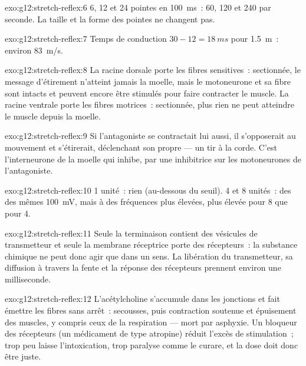 \begin{solution}{exo:g12:stretch-reflex:6}
6, 12 et 24 pointes en \qty{100}{ms}~: 60, 120 et 240 par seconde. La
taille et la forme des pointes ne changent pas.
\end{solution}

\begin{solution}{exo:g12:stretch-reflex:7}
Temps de conduction $30 - 12 = \qty{18}{ms}$ pour \qty{1.5}{m}~:
environ \qty{83}{m/s}.
\end{solution}

\begin{solution}{exo:g12:stretch-reflex:8}
La racine dorsale porte les fibres sensitives~: sectionnée, le message
d'étirement n'atteint jamais la moelle, mais le motoneurone et sa
fibre sont intacts et peuvent encore être stimulés pour faire
contracter le muscle. La racine ventrale porte les fibres motrices~:
sectionnée, plus rien ne peut atteindre le muscle depuis la moelle.
\end{solution}

\begin{solution}{exo:g12:stretch-reflex:9}
Si l'antagoniste se contractait lui aussi, il s'opposerait au
mouvement et s'étirerait, déclenchant son propre  --- un
tir à la corde. C'est l'interneurone de la moelle qui inhibe, par une
 inhibitrice sur les motoneurones de l'antagoniste.
\end{solution}

\begin{solution}{exo:g12:stretch-reflex:10}
1 unité~: rien (au-dessous du seuil). 4 et 8 unités~: des  des mêmes \qty{100}{mV}, mais à des fréquences plus élevées,
plus élevée pour 8 que pour 4.
\end{solution}

\begin{solution}{exo:g12:stretch-reflex:11}
Seule la terminaison contient des vésicules de transmetteur et seule
la membrane réceptrice porte des récepteurs~: la substance chimique ne
peut donc agir que dans un sens. La libération du transmetteur, sa
diffusion à travers la fente et la réponse des récepteurs prennent
environ une milliseconde.
\end{solution}

\begin{solution}{exo:g12:stretch-reflex:12}
L'acétylcholine s'accumule dans les jonctions et fait émettre les
fibres sans arrêt~: secousses, puis contraction soutenue et épuisement
des muscles, y compris ceux de la respiration --- mort par asphyxie.
Un bloqueur des récepteurs (un médicament de type atropine) réduit
l'excès de stimulation~; trop peu laisse l'intoxication, trop paralyse
comme le curare, et la dose doit donc être juste.
\end{solution}


